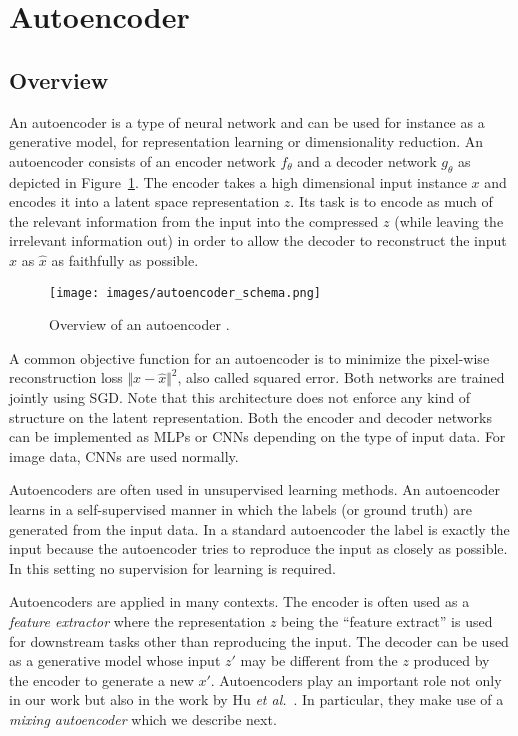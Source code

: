 \documentclass[a4paper,12pt]{report}
\begin{document}
\section{Autoencoder}
\subsection{Overview}
An autoencoder is a type of neural network and can be used for instance as a generative model, for representation learning or dimensionality reduction. An autoencoder consists of an encoder network $f_{\theta}$ and a decoder network  $g_{\theta}$ as depicted in Figure~\ref{fig:autoencoder}. The encoder takes a high dimensional input instance $x$ and encodes it into a latent space representation $z$. Its task is to encode as much of the relevant information from the input into the compressed $z$ (while leaving the irrelevant information out) in order to allow the decoder to reconstruct the input $x$ as $\hat{x}$ as faithfully as possible.
\begin{figure}[ht]
\centering
\texttt{[image: images/autoencoder\_schema.png]}
\caption{Overview of an autoencoder \cite{chollet_autoencoders}.}
\label{fig:autoencoder}
\end{figure}
A common objective function for an autoencoder is to minimize the pixel-wise reconstruction loss $\Vert x - \hat{x} \Vert^2$, also called squared error. Both networks are trained jointly using SGD. Note that this architecture does not enforce any kind of structure on the latent representation. Both the encoder and decoder networks can be implemented as MLPs or CNNs depending on the type of input data. For image data, CNNs are used normally.

Autoencoders are often used in unsupervised learning methods. An autoencoder learns in a self-supervised manner in which the labels (or ground truth) are generated from the input data. In a standard autoencoder the label is exactly the input because the autoencoder tries to reproduce the input as closely as possible. In this setting no supervision for learning is required.

Autoencoders are applied in many contexts. The encoder is often used as a \textit{feature extractor} where the representation $z$ being the ``feature extract'' is used for downstream tasks other than reproducing the input. The decoder can be used as a generative model whose input $z'$ may be different from the $z$ produced by the encoder to generate a new $x'$. Autoencoders play an important role not only in our work but also in the work by Hu \textit{et al.}~\cite{DisentFacOfVarByMixTh}. In particular, they make use of a \textit{mixing autoencoder} which we describe next.
\end{document}
